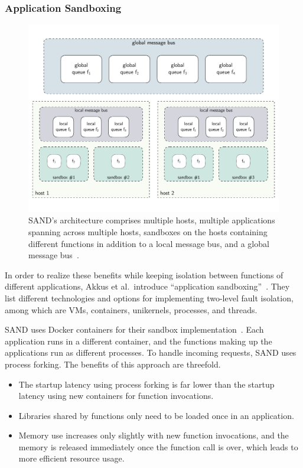 \subsubsection{Application Sandboxing}\label{subsub:application_sandboxing}

\begin{figure}
    \centering
    \includegraphics[width=\linewidth]{figures/sand_architecture.pdf}
    \caption{
        SAND's architecture comprises multiple hosts, multiple applications spanning across multiple hosts, sandboxes on the hosts containing different functions in addition to a local message bus, and a global message bus~\cite{akkus2018sand}.
    }\label{fig:sand_architecture}
\end{figure}

In order to realize these benefits while keeping isolation between functions of different applications, Akkus et al.~introduce \enquote{application sandboxing}~\cite{akkus2018sand}.
They list different technologies and options for implementing two-level fault isolation, among which are VMs, containers, unikernels, processes, and threads.

SAND uses Docker containers for their sandbox implementation~\cite{akkus2018sand}.
Each application runs in a different container, and the functions making up the applications run as different processes.
To handle incoming requests, SAND uses process forking.
The benefits of this approach are threefold.
\begin{itemize}
    \item The startup latency using process forking is far lower than the startup latency using new containers for function invocations.
    \item Libraries shared by functions only need to be loaded once in an application.
    \item Memory use increases only slightly with new function invocations, and the memory is released immediately once the function call is over, which leads to more efficient resource usage.
\end{itemize}

